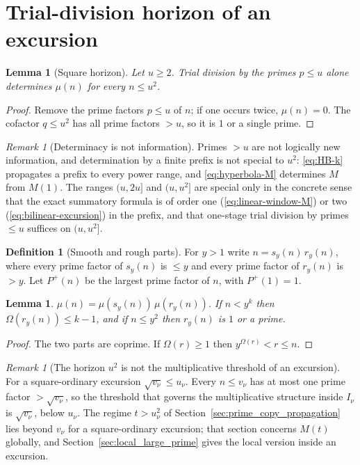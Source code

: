 \documentclass[11pt]{amsart}
\numberwithin{equation}{section}
\theoremstyle{plain}
\newtheorem{lemma}[theorem]{Lemma}
\theoremstyle{definition}
\newtheorem{definition}[theorem]{Definition}
\theoremstyle{remark}
\newtheorem{remark}[theorem]{Remark}
\newcommand{\Pp}{P^{+}}
\begin{document}
\section{Trial-division horizon of an excursion}
\label{sec:prime_horizon}

\begin{lemma}[Square horizon]
\label{lem:square-horizon}
Let $u\ge2$. Trial division by the primes $p\le u$ alone determines $\mu(n)$
for every $n\le u^2$.
\end{lemma}

\begin{proof}
Remove the prime factors $p\le u$ of $n$; if one occurs twice, $\mu(n)=0$.
The cofactor $q\le u^2$ has all prime factors $>u$, so it is $1$ or a single
prime.
\end{proof}

\begin{remark}[Determinacy is not information]
\label{rem:information}
\label{warn:information_language}
Primes $>u$ are not logically new information, and determination by a
finite prefix is not special to $u^2$: \eqref{eq:HB-k} propagates a prefix
to every power range, and \eqref{eq:hyperbola-M} determines $M$ from $M(1)$.
The ranges $(u,2u]$ and $(u,u^2]$ are special only in the concrete sense
that the exact summatory formula is of order one
(\eqref{eq:linear-window-M}) or two (\eqref{eq:bilinear-excursion}) in the
prefix, and that one-stage trial division by primes $\le u$ suffices on
$(u,u^2]$.
\end{remark}

\begin{definition}[Smooth and rough parts]
\label{def:smooth_rough}
For $y>1$ write $n=s_y(n)\,r_y(n)$, where every prime factor of $s_y(n)$
is $\le y$ and every prime factor of $r_y(n)$ is $>y$. Let $\Pp(n)$ be the
largest prime factor of $n$, with $\Pp(1)=1$.
\end{definition}

\begin{lemma}
\label{lem:rough_part}
$\mu(n)=\mu(s_y(n))\,\mu(r_y(n))$. If $n<y^k$ then $\Omega(r_y(n))\le k-1$,
and if $n\le y^2$ then $r_y(n)$ is $1$ or a prime.
\end{lemma}

\begin{proof}
The two parts are coprime. If $\Omega(r)\ge1$ then $y^{\Omega(r)}<r\le n$.
\end{proof}

\begin{remark}[The horizon $u^2$ is not the multiplicative threshold of an excursion]
\label{rem:horizon_inactive}
For a square-ordinary excursion $\sqrt{v_\nu}\le u_\nu$. Every $n\le v_\nu$
has at most one prime factor $>\sqrt{v_\nu}$, so the threshold that governs
the multiplicative structure inside $I_\nu$ is $\sqrt{v_\nu}$, below
$u_\nu$. The regime $t>u_\nu^2$ of Section~\ref{sec:prime_copy_propagation}
lies beyond $v_\nu$ for a square-ordinary excursion; that section concerns
$M(t)$ globally, and Section~\ref{sec:local_large_prime} gives the local
version inside an excursion.
\end{remark}
\end{document}
